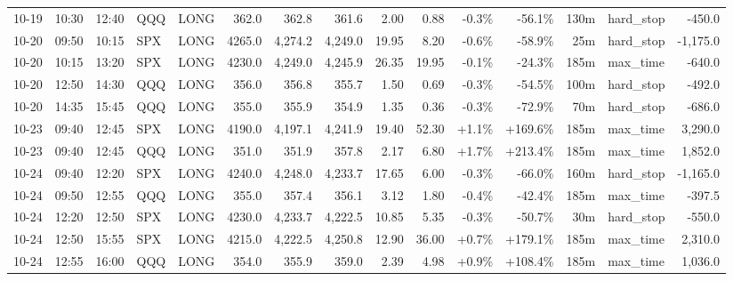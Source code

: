 \documentclass[11pt,a4paper,twoside]{article}
\begin{document}
\begin{landscape}
\begin{center}
\begin{longtable}{>{\color{txtmain}}l l l l l r r r r r r r r >{\color{txtmain}}l r}
10-19 & 10:30 & 12:40 & QQQ & LONG & 362.0 & 362.8 & 361.6 & 2.00 & 0.88 & \textcolor{lossred}{-0.3\%} & \textcolor{lossred}{-56.1\%} & 130m & hard\_stop & \textcolor{lossred}{-450.0} \\
10-20 & 09:50 & 10:15 & SPX & LONG & 4265.0 & 4,274.2 & 4,249.0 & 19.95 & 8.20 & \textcolor{lossred}{-0.6\%} & \textcolor{lossred}{-58.9\%} & 25m & hard\_stop & \textcolor{lossred}{-1,175.0} \\
10-20 & 10:15 & 13:20 & SPX & LONG & 4230.0 & 4,249.0 & 4,245.9 & 26.35 & 19.95 & \textcolor{lossred}{-0.1\%} & \textcolor{lossred}{-24.3\%} & 185m & max\_time & \textcolor{lossred}{-640.0} \\
10-20 & 12:50 & 14:30 & QQQ & LONG & 356.0 & 356.8 & 355.7 & 1.50 & 0.69 & \textcolor{lossred}{-0.3\%} & \textcolor{lossred}{-54.5\%} & 100m & hard\_stop & \textcolor{lossred}{-492.0} \\
10-20 & 14:35 & 15:45 & QQQ & LONG & 355.0 & 355.9 & 354.9 & 1.35 & 0.36 & \textcolor{lossred}{-0.3\%} & \textcolor{lossred}{-72.9\%} & 70m & hard\_stop & \textcolor{lossred}{-686.0} \\
10-23 & 09:40 & 12:45 & SPX & LONG & 4190.0 & 4,197.1 & 4,241.9 & 19.40 & 52.30 & \textcolor{wingreen}{+1.1\%} & \textcolor{wingreen}{+169.6\%} & 185m & max\_time & \textcolor{wingreen}{3,290.0} \\
10-23 & 09:40 & 12:45 & QQQ & LONG & 351.0 & 351.9 & 357.8 & 2.17 & 6.80 & \textcolor{wingreen}{+1.7\%} & \textcolor{wingreen}{+213.4\%} & 185m & max\_time & \textcolor{wingreen}{1,852.0} \\
10-24 & 09:40 & 12:20 & SPX & LONG & 4240.0 & 4,248.0 & 4,233.7 & 17.65 & 6.00 & \textcolor{lossred}{-0.3\%} & \textcolor{lossred}{-66.0\%} & 160m & hard\_stop & \textcolor{lossred}{-1,165.0} \\
10-24 & 09:50 & 12:55 & QQQ & LONG & 355.0 & 357.4 & 356.1 & 3.12 & 1.80 & \textcolor{lossred}{-0.4\%} & \textcolor{lossred}{-42.4\%} & 185m & max\_time & \textcolor{lossred}{-397.5} \\
10-24 & 12:20 & 12:50 & SPX & LONG & 4230.0 & 4,233.7 & 4,222.5 & 10.85 & 5.35 & \textcolor{lossred}{-0.3\%} & \textcolor{lossred}{-50.7\%} & 30m & hard\_stop & \textcolor{lossred}{-550.0} \\
10-24 & 12:50 & 15:55 & SPX & LONG & 4215.0 & 4,222.5 & 4,250.8 & 12.90 & 36.00 & \textcolor{wingreen}{+0.7\%} & \textcolor{wingreen}{+179.1\%} & 185m & max\_time & \textcolor{wingreen}{2,310.0} \\
10-24 & 12:55 & 16:00 & QQQ & LONG & 354.0 & 355.9 & 359.0 & 2.39 & 4.98 & \textcolor{wingreen}{+0.9\%} & \textcolor{wingreen}{+108.4\%} & 185m & max\_time & \textcolor{wingreen}{1,036.0} \\

\end{longtable}
\end{center}
\end{landscape}
\end{document}
